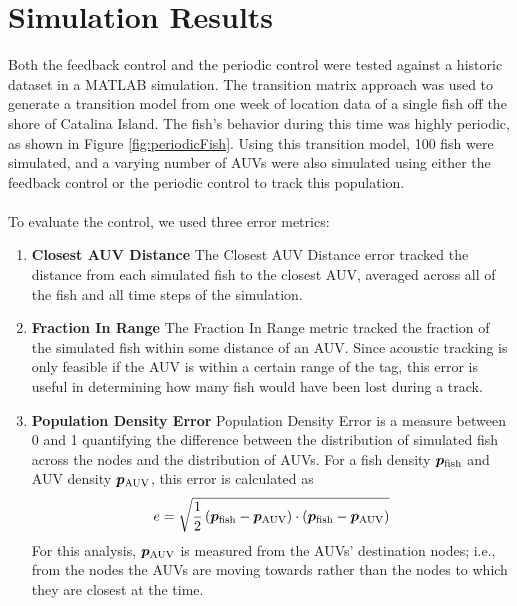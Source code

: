 \documentclass[11pt,letterpaper]{article}
\author{Kevin Smith}
\begin{document}
	
	\section{Simulation Results}
	
	Both the feedback control and the periodic control were tested against a historic dataset in a MATLAB simulation. The transition matrix approach was used to generate a transition model from one week of location data of a single fish off the shore of Catalina Island. The fish's behavior during this time was highly periodic, as shown in Figure \ref{fig:periodicFish}. Using this transition model, 100 fish were simulated, and a varying number of AUVs were also simulated using either the feedback control or the periodic control to track this population.
	\\\\
	To evaluate the control, we used three error metrics:
	\begin{enumerate}
		\item
		\textbf{Closest AUV Distance} The Closest AUV Distance error tracked the distance from each simulated fish to the closest AUV, averaged across all of the fish and all time steps of the simulation.
		\item
		\textbf{Fraction In Range} The Fraction In Range metric tracked the fraction of the simulated fish within some distance of an AUV. Since acoustic tracking is only feasible if the AUV is within a certain range of the tag, this error is useful in determining how many fish would have been lost during a track.
		\item
		\textbf{Population Density Error} Population Density Error is a measure between 0 and 1 quantifying the difference between the distribution of simulated fish across the nodes and the distribution of AUVs. For a fish density $\bm p_{\rm fish}$ and AUV density $\bm p_{\rm AUV}$, this error is calculated as
		\[
			e = \sqrt{ \frac 1 2 \left( \bm p_{\rm fish} - \bm p_{\rm AUV} \right) \cdot \left( \bm p_{\rm fish} - \bm p_{\rm AUV} \right) }
		\]
		For this analysis, $\bm p_{\rm AUV}$ is measured from the AUVs' destination nodes; i.e., from the nodes the AUVs are moving towards rather than the nodes to which they are closest at the time.
	\end{enumerate}
	
\end{document}
